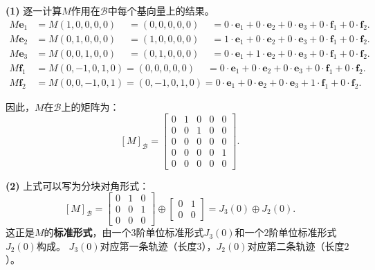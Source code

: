 \documentclass[12pt,UTF8]{ctexbook}
\begin{document}
\begin{so}
\textbf{(1)} 逐一计算$M$作用在$\mathcal{B}$中每个基向量上的结果。
\begin{align*}
    M\mathbf{e}_1 &= M(1,0,0,0,0) \phantom{-}= (0,0,0,0,0) \phantom{-}= 0\cdot\mathbf{e}_1 + 0\cdot\mathbf{e}_2 + 0\cdot\mathbf{e}_3 + 0\cdot\mathbf{f}_1 + 0\cdot\mathbf{f}_2.\\
    M\mathbf{e}_2 &= M(0,1,0,0,0) \phantom{-}= (1,0,0,0,0) \phantom{-}= 1\cdot\mathbf{e}_1 + 0\cdot\mathbf{e}_2 + 0\cdot\mathbf{e}_3 + 0\cdot\mathbf{f}_1 + 0\cdot\mathbf{f}_2.\\
    M\mathbf{e}_3 &= M(0,0,1,0,0) \phantom{-}= (0,1,0,0,0) \phantom{-}= 0\cdot\mathbf{e}_1 + 1\cdot\mathbf{e}_2 + 0\cdot\mathbf{e}_3 + 0\cdot\mathbf{f}_1 + 0\cdot\mathbf{f}_2.\\
    M\mathbf{f}_1 &= M(0,-1,0,1,0) = (0,0,0,0,0) \phantom{-}= 0\cdot\mathbf{e}_1 + 0\cdot\mathbf{e}_2 + 0\cdot\mathbf{e}_3 + 0\cdot\mathbf{f}_1 + 0\cdot\mathbf{f}_2.\\
    M\mathbf{f}_2 &= M(0,0,-1,0,1) = (0,-1,0,1,0) = 0\cdot\mathbf{e}_1 + 0\cdot\mathbf{e}_2 + 0\cdot\mathbf{e}_3 + 1\cdot\mathbf{f}_1 + 0\cdot\mathbf{f}_2.
\end{align*}

因此，$M$在$\mathcal{B}$上的矩阵为：
$$
[M]_{\mathcal{B}} = \begin{bmatrix}
0 & 1 & 0 & 0 & 0 \\
0 & 0 & 1 & 0 & 0 \\
0 & 0 & 0 & 0 & 0 \\
0 & 0 & 0 & 0 & 1 \\
0 & 0 & 0 & 0 & 0
\end{bmatrix}.
$$

\textbf{(2)} 上式可以写为分块对角形式：
$$
[M]_{\mathcal{B}} = \begin{bmatrix}
0 & 1 & 0 \\
0 & 0 & 1 \\
0 & 0 & 0
\end{bmatrix} \oplus \begin{bmatrix}
0 & 1 \\
0 & 0
\end{bmatrix} = J_3(0) \oplus J_2(0).
$$
这正是$M$的\textbf{标准形式}，由一个$3$阶单位标准形式$J_3(0)$和一个$2$阶单位标准形式$J_2(0)$构成。
$J_3(0)$对应第一条轨迹（长度$3$），$J_2(0)$对应第二条轨迹（长度$2$）。


\end{so}
\end{document}
